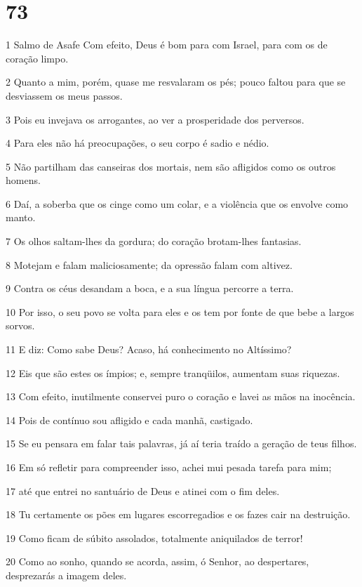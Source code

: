 \chapter{73}

\par 1 Salmo de Asafe Com efeito, Deus é bom para com Israel, para com os de coração limpo.
\par 2 Quanto a mim, porém, quase me resvalaram os pés; pouco faltou para que se desviassem os meus passos.
\par 3 Pois eu invejava os arrogantes, ao ver a prosperidade dos perversos.
\par 4 Para eles não há preocupações, o seu corpo é sadio e nédio.
\par 5 Não partilham das canseiras dos mortais, nem são afligidos como os outros homens.
\par 6 Daí, a soberba que os cinge como um colar, e a violência que os envolve como manto.
\par 7 Os olhos saltam-lhes da gordura; do coração brotam-lhes fantasias.
\par 8 Motejam e falam maliciosamente; da opressão falam com altivez.
\par 9 Contra os céus desandam a boca, e a sua língua percorre a terra.
\par 10 Por isso, o seu povo se volta para eles e os tem por fonte de que bebe a largos sorvos.
\par 11 E diz: Como sabe Deus? Acaso, há conhecimento no Altíssimo?
\par 12 Eis que são estes os ímpios; e, sempre tranqüilos, aumentam suas riquezas.
\par 13 Com efeito, inutilmente conservei puro o coração e lavei as mãos na inocência.
\par 14 Pois de contínuo sou afligido e cada manhã, castigado.
\par 15 Se eu pensara em falar tais palavras, já aí teria traído a geração de teus filhos.
\par 16 Em só refletir para compreender isso, achei mui pesada tarefa para mim;
\par 17 até que entrei no santuário de Deus e atinei com o fim deles.
\par 18 Tu certamente os pões em lugares escorregadios e os fazes cair na destruição.
\par 19 Como ficam de súbito assolados, totalmente aniquilados de terror!
\par 20 Como ao sonho, quando se acorda, assim, ó Senhor, ao despertares, desprezarás a imagem deles.
